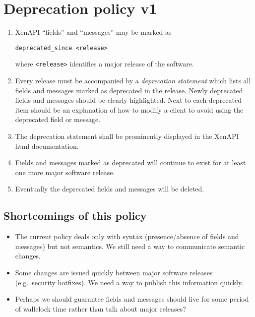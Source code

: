 \documentclass{article}
\begin{document}
\section{Deprecation policy v1}
\begin{enumerate}

\item XenAPI ``fields'' and ``messages'' may be marked as
\begin{verbatim}
deprecated_since <release>
\end{verbatim}
where \texttt{<release>} identifies a major release of the software.

\item Every release must be accompanied by a {\em deprecation statement} which lists all fields and messages marked as deprecated in the release.
Newly deprecated fields and messages should be clearly highlighted.
Next to each deprecated item should be an explanation of how to modify a client to avoid using the deprecated field or message.

\item The deprecation statement shall be prominently displayed in the XenAPI html documentation.

\item Fields and messages marked as deprecated will continue to exist for at least one more major software release.

\item Eventually the deprecated fields and messages will be deleted.
\end{enumerate}

\subsection{Shortcomings of this policy}
\begin{itemize}
\item The current policy deals only with syntax (presence/absence of fields and messages) but not semantics. We still need a way to communicate semantic changes.
\item Some changes are issued quickly between major software releases (e.g.\ security hotfixes). We need a way to publish this information quickly.

\item Perhaps we should guarantee fields and messages should live for some period of wallclock time rather than talk about major releases?
\end{itemize}


\end{document}
